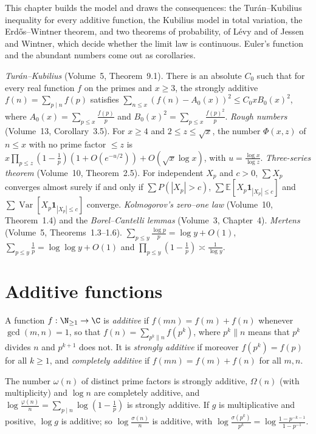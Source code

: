This chapter builds the model and draws the consequences: the Tur\'an--Kubilius inequality for every additive function, the Kubilius model in total variation, the Erd\H{o}s--Wintner theorem, and two theorems of probability, of L\'evy and of Jessen and Wintner, which decide whether the limit law is continuous. Euler's function and the abundant numbers come out as corollaries.

\begin{reminder}
\emph{Tur\'an--Kubilius} (Volume~5, Theorem~9.1). There is an absolute $C_0$ such that for every real function $f$ on the primes and $x\ge3$, the strongly additive $f(n)=\sum_{p\mid n}f(p)$ satisfies $\sum_{n\le x}(f(n)-A_0(x))^2\le C_0xB_0(x)^2$, where $A_0(x)=\sum_{p\le x}\frac{f(p)}p$ and $B_0(x)^2=\sum_{p\le x}\frac{f(p)^2}p$.
\emph{Rough numbers} (Volume~13, Corollary~3.5). For $x\ge4$ and $2\le z\le\sqrt x$, the number $\Phi(x,z)$ of $n\le x$ with no prime factor $\le z$ is $x\prod_{p\le z}(1-\frac1p)(1+O(e^{-u/2}))+O(\sqrt x\log x)$, with $u=\frac{\log x}{\log z}$.
\emph{Three-series theorem} (Volume~10, Theorem~2.5). For independent $X_p$ and $c>0$, $\sum X_p$ converges almost surely if and only if $\sum P(|X_p|>c)$, $\sum\mathbb E[X_p\mathbf 1_{|X_p|\le c}]$ and $\sum\operatorname{Var}[X_p\mathbf 1_{|X_p|\le c}]$ converge.
\emph{Kolmogorov's zero--one law} (Volume~10, Theorem~1.4) and the \emph{Borel--Cantelli lemmas} (Volume~3, Chapter~4).
\emph{Mertens} (Volume~5, Theorems~1.3--1.6). $\sum_{p\le y}\frac{\log p}p=\log y+O(1)$, $\sum_{p\le y}\frac1p=\log\log y+O(1)$ and $\prod_{p\le y}(1-\frac1p)\asymp\frac1{\log y}$.
\end{reminder}

\section{Additive functions}

\begin{definition}\label{def:additive}
A function $f:\N_{\ge1}\to\C$ is \emph{additive} if $f(mn)=f(m)+f(n)$ whenever $\gcd(m,n)=1$, so that $f(n)=\sum_{p^k\parallel n}f(p^k)$, where $p^k\parallel n$ means that $p^k$ divides $n$ and $p^{k+1}$ does not. It is \emph{strongly additive} if moreover $f(p^k)=f(p)$ for all $k\ge1$, and \emph{completely additive} if $f(mn)=f(m)+f(n)$ for all $m,n$.
\end{definition}

The number $\omega(n)$ of distinct prime factors is strongly additive, $\Omega(n)$ (with multiplicity) and $\log n$ are completely additive, and $\log\frac{\varphi(n)}n=\sum_{p\mid n}\log(1-\frac1p)$ is strongly additive. If $g$ is multiplicative and positive, $\log g$ is additive; so $\log\frac{\sigma(n)}n$ is additive, with $\log\frac{\sigma(p^k)}{p^k}=\log\frac{1-p^{-k-1}}{1-p^{-1}}$.

